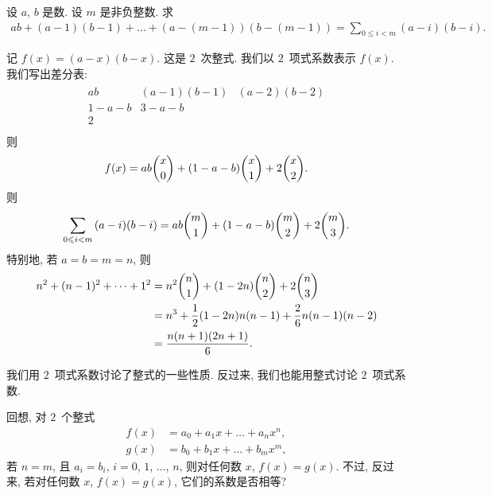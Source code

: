 \documentclass[../libro.tex]{subfiles}
\begin{document}
\begin{example}
    设 \(a\), \(b\) 是数.
    设 \(m\) 是非负整数.
    求
    \begin{align*}
        a b + (a - 1) (b - 1) + \dots + (a - (m - 1)) (b - (m - 1))
        = \sum_{0 \leq i < m} {(a - i) (b - i)}.
    \end{align*}

    记 \(f(x) = (a - x) (b - x)\).
    这是 \(2\)~次整式.
    我们以 \(2\)~项式系数表示 \(f(x)\).
    我们写出差分表:
    \begin{align*}
        \begin{matrix}
            a b & (a - 1) (b - 1) & (a - 2) (b - 2) \\
            1 - a - b & 3 - a - b & {} \\
            2 & {} & {} \\
        \end{matrix}
    \end{align*}
    则
    \begin{align*}
        f(x) = a b \dbinom{x}{0} + (1 - a - b) \dbinom{x}{1}
        + 2 \dbinom{x}{2}.
    \end{align*}
    则
    \begin{align*}
        \sum_{0 \leq i < m} {(a - i) (b - i)}
        = a b \dbinom{m}{1} + (1 - a - b) \dbinom{m}{2}
        + 2 \dbinom{m}{3}.
    \end{align*}
    特别地, 若 \(a = b = m = n\), 则
    \begin{align*}
        n^2 + (n - 1)^2 + \dots + 1^2
        = {} &
        n^2 \dbinom{n}{1} + (1 - 2n) \dbinom{n}{2} + 2 \dbinom{n}{3}
        \\
        = {} &
        n^3 + \frac{1}{2} (1 - 2n) n (n - 1) + \frac{2}{6} n (n - 1) (n - 2)
        \\
        = {} &
        \frac{n (n + 1) (2n + 1)}{6}.
        \qefhere
    \end{align*}
\end{example}

我们用 \(2\)~项式系数讨论了整式的一些性质.
反过来, 我们也能用整式讨论 \(2\)~项式系数.

回想, 对 \(2\)~个整式
\begin{align*}
    f(x) & = a_0 + a_1 x + \dots + a_n x^n, \\
    g(x) & = b_0 + b_1 x + \dots + b_m x^m,
\end{align*}
若 \(n = m\), 且 \(a_i = b_i\), \(i = 0\), \(1\), \(\dots\), \(n\),
则对任何数 \(x\), \(f(x) = g(x)\).
不过, 反过来, 若对任何数 \(x\), \(f(x) = g(x)\),
它们的系数是否相等?
\end{document}
